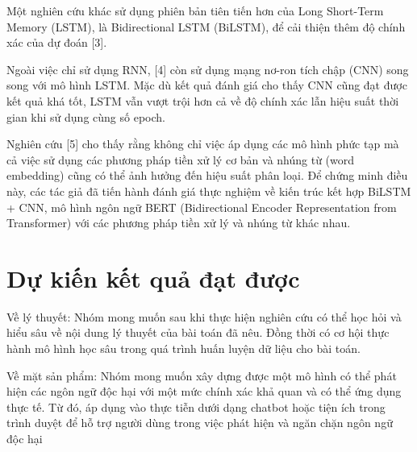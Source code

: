 Một nghiên cứu khác sử dụng phiên bản tiên tiến hơn của Long Short-Term Memory (LSTM), là Bidirectional LSTM (BiLSTM), để cải thiện thêm độ chính xác của dự đoán [3]. 

Ngoài việc chỉ sử dụng RNN, [4] còn sử dụng mạng nơ-ron tích chập (CNN) song song với mô hình LSTM. Mặc dù kết quả đánh giá cho thấy CNN cũng đạt được kết quả khá tốt, LSTM vẫn vượt trội hơn cả về độ chính xác lẫn hiệu suất thời gian khi sử dụng cùng số epoch. 

Nghiên cứu [5] cho thấy rằng không chỉ việc áp dụng các mô hình phức tạp mà cả việc sử dụng các phương pháp tiền xử lý cơ bản và nhúng từ (word embedding) cũng có thể ảnh hưởng đến hiệu suất phân loại. Để chứng minh điều này, các tác giả đã tiến hành đánh giá thực nghiệm về kiến trúc kết hợp BiLSTM + CNN, mô hình ngôn ngữ BERT (Bidirectional Encoder Representation from Transformer) với các phương pháp tiền xử lý và nhúng từ khác nhau.

\section{Dự kiến kết quả đạt được}
Về lý thuyết: Nhóm mong muốn sau khi thực hiện nghiên cứu có thể học hỏi và hiểu sâu về nội dung lý thuyết của bài toán đã nêu. Đồng thời có cơ hội thực hành mô hình học sâu trong quá trình huấn luyện dữ liệu cho bài toán.

Về mặt sản phẩm: Nhóm mong muốn xây dựng được một mô hình có thể phát hiện các ngôn ngữ độc hại với một mức chính xác khả quan và có thể ứng dụng thực tế. Từ đó, áp dụng vào thực tiễn dưới dạng chatbot hoặc tiện ích trong trình duyệt để hỗ trợ người dùng trong việc phát hiện và ngăn chặn ngôn ngữ độc hại

